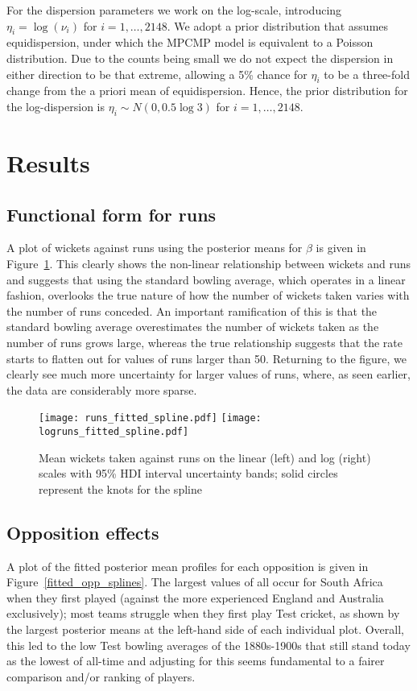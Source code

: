 \documentclass{statsoc}
\newcommand{\numtestbowlers}{2148}
\begin{document}
For the dispersion parameters we work on the log-scale, introducing $\eta_i = \log(\nu_i)$ for $i = 1, \ldots, \numtestbowlers$. We adopt a prior distribution that assumes equidispersion, under which the MPCMP model is equivalent to a Poisson distribution. Due to the counts being small we do not expect the dispersion in either direction to be that extreme, allowing a 5\% chance for $\eta_i$ to be a three-fold change from the a priori mean of equidispersion. Hence, the prior distribution for the log-dispersion is $\eta_i \sim N(0, 0.5 \log 3)$ for $i = 1, \ldots, \numtestbowlers$.

\section{Results}

\subsection{Functional form for runs}
A plot of wickets against runs using the posterior means for $\beta$ is given in Figure~\ref{fitted_runs_spline}. This clearly shows the non-linear relationship between wickets and runs and suggests that using the standard bowling average, which operates in a linear fashion, overlooks the true nature of how the number of wickets taken varies with the number of runs conceded. An important ramification of this is that the standard bowling average overestimates the number of wickets taken as the number of runs grows large, whereas the true relationship suggests that the rate starts to flatten out for values of runs larger than 50. Returning to the figure, we clearly see much more uncertainty for larger values of runs, where, as seen earlier, the data are considerably more sparse.

\begin{figure}%
    \centering
    \texttt{[image: runs\_fitted\_spline.pdf]}
    \texttt{[image: logruns\_fitted\_spline.pdf]}
    \caption{Mean wickets taken against runs on the linear (left) and log (right) scales with 95\% HDI interval uncertainty bands; solid circles represent the knots for the spline}
    \label{fitted_runs_spline}
\end{figure}

\subsection{Opposition effects}
A plot of the fitted posterior mean profiles for each opposition is given in Figure~\ref{fitted_opp_splines}. The largest values of all occur for South Africa when they first played (against the more experienced England and Australia exclusively); most teams struggle when they first play Test cricket, as shown by the largest posterior means at the left-hand side of each individual plot. Overall, this led to the low Test bowling averages of the 1880s-1900s that still stand today as the lowest of all-time and adjusting for this seems fundamental to a fairer comparison and/or ranking of players.
\end{document}

